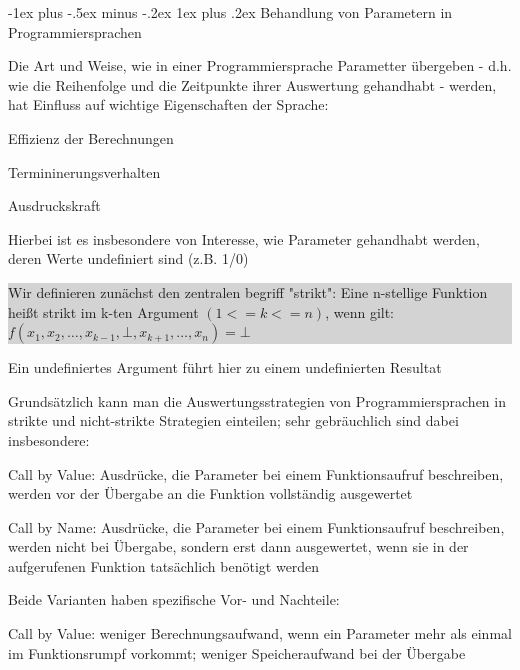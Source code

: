\documentclass[10pt]{article}
\makeatletter
\renewcommand{\subsubsection}{\@startsection{subsubsection}{3}{0mm}%
                                {-1ex plus -.5ex minus -.2ex}%
                                {1ex plus .2ex}%
                                {\normalfont\small\bfseries}}
\makeatother
\begin{document}
  \subsubsection{Behandlung von Parametern in Programmiersprachen}
  \begin{itemize*}
    \item Die Art und Weise, wie in einer Programmiersprache Parametter übergeben - d.h. wie die Reihenfolge und die Zeitpunkte ihrer Auswertung gehandhabt - werden, hat Einfluss auf wichtige Eigenschaften der Sprache:
    \begin{itemize*}
      \item Effizienz der Berechnungen
      \item Termininerungsverhalten
      \item Ausdruckskraft
    \end{itemize*}
    \item Hierbei ist es insbesondere von Interesse, wie Parameter gehandhabt werden, deren Werte undefiniert sind (z.B. 1/0)\newline
    \colorbox{lightgray}{
      \begin{minipage}[h]{1.0\linewidth}
        Wir definieren zunächst den zentralen begriff "strikt": \newline Eine n-stellige Funktion heißt strikt im k-ten Argument $(1<=k<=n)$, wenn gilt: $f(x_1,x_2,…,x_{k-1},\bot,x_{k+1},…,x_n)=\bot$
      \end{minipage}}
    \item Ein undefiniertes Argument führt hier zu einem undefinierten Resultat
    \item Grundsätzlich kann man die Auswertungsstrategien von Programmiersprachen in strikte und nicht-strikte Strategien einteilen; sehr gebräuchlich sind dabei insbesondere:
    \begin{itemize*}
      \item Call by Value: Ausdrücke, die Parameter bei einem Funktionsaufruf beschreiben, werden vor der Übergabe an die Funktion vollständig ausgewertet
      \item Call by Name: Ausdrücke, die Parameter bei einem Funktionsaufruf beschreiben, werden nicht bei Übergabe, sondern erst dann ausgewertet, wenn sie in der aufgerufenen Funktion tatsächlich benötigt werden
    \end{itemize*}
    \item Beide Varianten haben spezifische Vor- und Nachteile:
    \begin{itemize*}
      \item Call by Value: weniger Berechnungsaufwand, wenn ein Parameter mehr als einmal im Funktionsrumpf vorkommt; weniger Speicheraufwand bei der Übergabe

\end{itemize*}
\end{itemize*}
\end{document}
